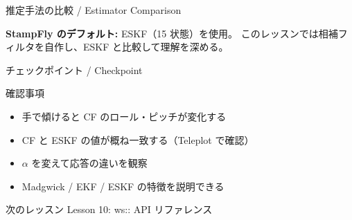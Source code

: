 \begin{frame}{推定手法の比較 / Estimator Comparison}
  \centering

  \vspace{0.8em}

  {\footnotesize
    \textbf{StampFly のデフォルト:} ESKF（15 状態）を使用。
    このレッスンでは相補フィルタを自作し、ESKF と比較して理解を深める。
  }
\end{frame}

\begin{frame}{チェックポイント / Checkpoint}
  \begin{alertblock}{確認事項}
    \begin{itemize}
      \item[$\square$] 手で傾けると CF のロール・ピッチが変化する
      \item[$\square$] CF と ESKF の値が概ね一致する（Teleplot で確認）
      \item[$\square$] $\alpha$ を変えて応答の違いを観察
      \item[$\square$] Madgwick / EKF / ESKF の特徴を説明できる
    \end{itemize}
  \end{alertblock}

  \vspace{1em}

  \begin{block}{次のレッスン}
    Lesson 10: ws:: API リファレンス
  \end{block}
\end{frame}
